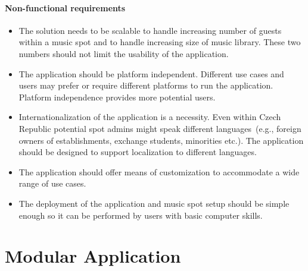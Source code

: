 \paragraph{Non-functional requirements}
\begin{itemize}
    \item The solution needs to be scalable to handle increasing number of guests within a music spot and to handle increasing size of music library. These two numbers should not limit the usability of the application.
    \item The application should be platform independent. Different use cases and users may prefer or require different platforms to run the application. Platform independence provides more potential users.
    \item Internationalization of the application is a necessity. Even within Czech Republic potential spot admins might speak different languages~(e.g., foreign owners of establishments, exchange students, minorities etc.). The application should be designed to support localization to different languages.
    \item The application should offer means of customization to accommodate a wide range of use cases.
    \item The deployment of the application and music spot setup should be simple enough so it can be performed by users with basic computer skills.
\end{itemize}

\section{Modular Application}

